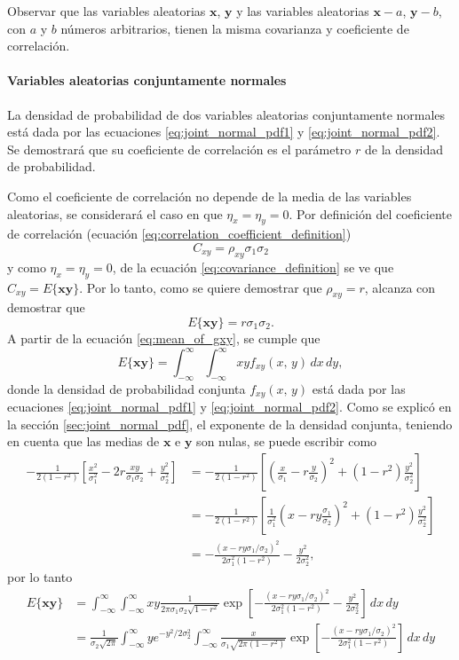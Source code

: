 \documentclass[a4paper]{report}
\newcommand{\x}{\mathbf{x}}
\newcommand{\y}{\mathbf{y}}
\begin{document}
Observar que las variables aleatorias \(\x\), \(\y\) y las variables aleatorias \(\x-a\), \(\y-b\), con \(a\) y \(b\) números arbitrarios, tienen la misma covarianza y coeficiente de correlación.

\paragraph{Variables aleatorias conjuntamente normales}

La densidad de probabilidad de dos variables aleatorias conjuntamente normales está dada por las ecuaciones \ref{eq:joint_normal_pdf1} y \ref{eq:joint_normal_pdf2}. Se demostrará que su coeficiente de correlación es el parámetro \(r\) de la densidad de probabilidad.

Como el coeficiente de correlación no depende de la media de las variables aleatorias, se considerará el caso en que \(\eta_x=\eta_y=0\). Por definición del coeficiente de correlación (ecuación \ref{eq:correlation_coefficient_definition})
\[
 C_{xy}=\rho_{xy}\sigma_1\sigma_2
\]
y como \(\eta_x=\eta_y=0\), de la ecuación \ref{eq:covariance_definition} se ve que \(C_{xy}=E\{\x\y\}\). Por lo tanto, como se quiere demostrar que \(\rho_{xy}=r\), alcanza con demostrar que
\[
 E\{\x\y\}=r\sigma_1\sigma_2.
\]
A partir de la ecuación \ref{eq:mean_of_gxy}, se cumple que
\[
 E\{\x\y\}=\int_{-\infty}^{\infty}\int_{-\infty}^{\infty}xyf_{xy}(x,\,y)\,dx\,dy,
\]
donde la densidad de probabilidad conjunta \(f_{xy}(x,\,y)\) está dada por las ecuaciones \ref{eq:joint_normal_pdf1} y \ref{eq:joint_normal_pdf2}.
Como se explicó en la sección \ref{sec:joint_normal_pdf}, el exponente de la densidad conjunta, teniendo en cuenta que las medias de \(\x\) e \(\y\) son nulas, se puede escribir como
\small
\begin{align*}
 -\frac{1}{2(1-r^2)}\left[\frac{x^2}{\sigma_1^2}-2r\frac{xy}{\sigma_1\sigma_2}+\frac{y^2}{\sigma_2^2}\right]
   &=-\frac{1}{2(1-r^2)}\left[\left(\frac{x}{\sigma_1}-r\frac{y}{\sigma_2}\right)^2+(1-r^2)\frac{y^2}{\sigma_2^2}\right]\\
   &=-\frac{1}{2(1-r^2)}\left[\frac{1}{\sigma_1^2}\left(x-ry\frac{\sigma_1}{\sigma_2}\right)^2+(1-r^2)\frac{y^2}{\sigma_2^2}\right]\\
   &=-\frac{(x-ry\sigma_1/\sigma_2)^2}{2\sigma_1^2(1-r^2)}-\frac{y^2}{2\sigma_2^2},
\end{align*}
\normalsize
por lo tanto
\small
\begin{align*}
 E\{\x\y\}&=\int_{-\infty}^{\infty}\int_{-\infty}^{\infty}xy\frac{1}{2\pi\sigma_1\sigma_2\sqrt{1-r^2}}\exp\left[-\frac{(x-ry\sigma_1/\sigma_2)^2}{2\sigma_1^2(1-r^2)}-\frac{y^2}{2\sigma_2^2}\right]\,dx\,dy\\
   &=\frac{1}{\sigma_2\sqrt{2\pi}} \int_{-\infty}^{\infty}ye^{-y^2/2\sigma_2^2}\int_{-\infty}^{\infty}\frac{x}{\sigma_1\sqrt{2\pi(1-r^2)}}\exp\left[-\frac{(x-ry\sigma_1/\sigma_2)^2}{2\sigma_1^2(1-r^2)}\right]\,dx\,dy
\end{align*}
\end{document}
